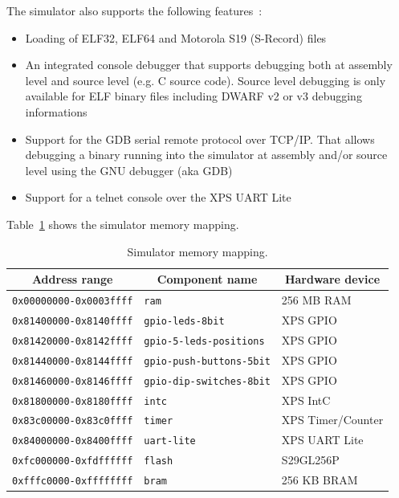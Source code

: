 \noindent The simulator also supports the following features :
\begin{itemize}
\item Loading of ELF32, ELF64 \cite{ELF} and Motorola S19 (S-Record) \cite{S19} files
\item An integrated console debugger that supports debugging both at assembly level and source level (e.g. C source code). Source level debugging is only available for ELF binary files including DWARF v2 or v3 \cite{DWARF3} debugging informations
\item Support for the GDB \cite{GDB} serial remote protocol over TCP/IP. That allows debugging a binary running into the simulator at assembly and/or source level using the GNU debugger (aka GDB)
\item Support for a telnet console over the XPS UART Lite
\end{itemize}

Table~\ref{table:memory_mapping} shows the simulator memory mapping.

\begin{table}[!ht]
	\begin{center}
		\begin{tabular}{|l|l|l|}
		\hline
		\multicolumn{1}{|c|}{\textbf{Address range}} & \multicolumn{1}{|c|}{\textbf{Component name}} & \multicolumn{1}{|c|}{\textbf{Hardware device}}\\
		\hline
		\texttt{0x00000000-0x0003ffff} & \texttt{ram} & 256 MB RAM\\
		\hline
		\texttt{0x81400000-0x8140ffff} & \texttt{gpio-leds-8bit} & XPS GPIO\\
		\hline
		\texttt{0x81420000-0x8142ffff} & \texttt{gpio-5-leds-positions} & XPS GPIO\\
		\hline
		\texttt{0x81440000-0x8144ffff} & \texttt{gpio-push-buttons-5bit} & XPS GPIO\\
		\hline
		\texttt{0x81460000-0x8146ffff} & \texttt{gpio-dip-switches-8bit} & XPS GPIO\\
		\hline
		\texttt{0x81800000-0x8180ffff} & \texttt{intc} & XPS IntC\\
		\hline
		\texttt{0x83c00000-0x83c0ffff} & \texttt{timer} & XPS Timer/Counter\\
		\hline
		\texttt{0x84000000-0x8400ffff} & \texttt{uart-lite} & XPS UART Lite\\
		\hline
		\texttt{0xfc000000-0xfdffffff} & \texttt{flash} & S29GL256P\\
		\hline
		\texttt{0xfffc0000-0xffffffff} & \texttt{bram} & 256 KB BRAM\\
		\hline
		\end{tabular}
	\end{center}
	\caption{Simulator memory mapping.}
	\label{table:memory_mapping}
\end{table}

